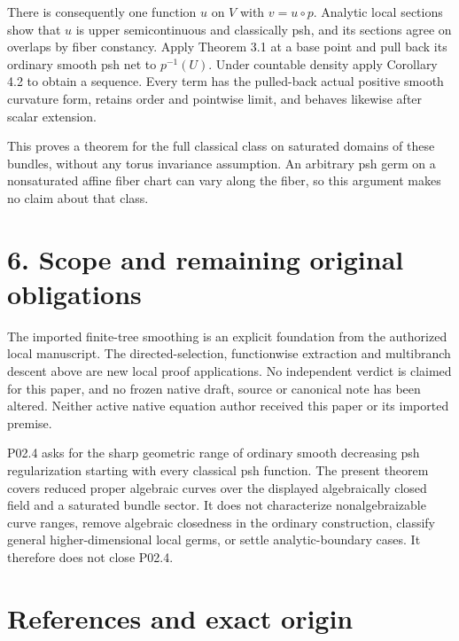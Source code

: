 \documentclass[
  11pt,
]{article}
\begin{document}
There is consequently one function \(u\) on \(V\) with \(v=u\circ p\).
Analytic local sections show that \(u\) is upper semicontinuous and
classically psh, and its sections agree on overlaps by fiber constancy.
Apply Theorem 3.1 at a base point and pull back its ordinary smooth psh
net to \(p^{-1}(U)\). Under countable density apply Corollary 4.2 to
obtain a sequence. Every term has the pulled-back actual positive smooth
curvature form, retains order and pointwise limit, and behaves likewise
after scalar extension.

This proves a theorem for the full classical class on saturated domains
of these bundles, without any torus invariance assumption. An arbitrary
psh germ on a nonsaturated affine fiber chart can vary along the fiber,
so this argument makes no claim about that class.

\section{6. Scope and remaining original
obligations}\label{scope-and-remaining-original-obligations}

The imported finite-tree smoothing is an explicit foundation from the
authorized local manuscript. The directed-selection, functionwise
extraction and multibranch descent above are new local proof
applications. No independent verdict is claimed for this paper, and no
frozen native draft, source or canonical note has been altered. Neither
active native equation author received this paper or its imported
premise.

P02.4 asks for the sharp geometric range of ordinary smooth decreasing
psh regularization starting with every classical psh function. The
present theorem covers reduced proper algebraic curves over the
displayed algebraically closed field and a saturated bundle sector. It
does not characterize nonalgebraizable curve ranges, remove algebraic
closedness in the ordinary construction, classify general
higher-dimensional local germs, or settle analytic-boundary cases. It
therefore does not close P02.4.

\section{References and exact origin}\label{references-and-exact-origin}
\end{document}
